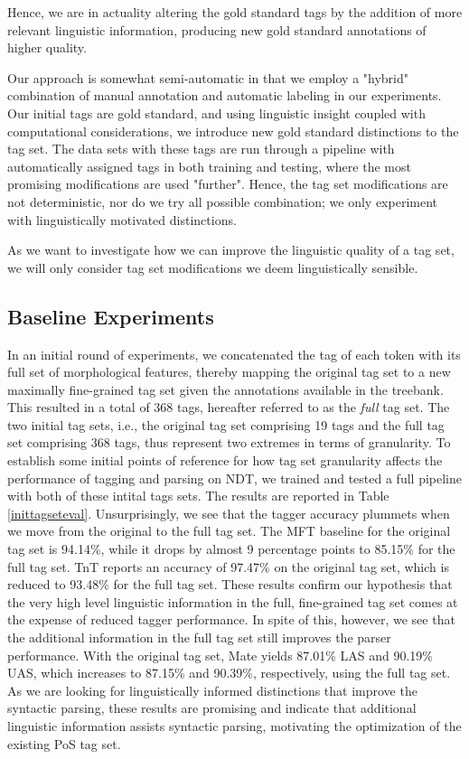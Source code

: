 \documentclass[11pt,a4paper]{article}
\begin{document}
Hence, we are in actuality altering the gold
standard tags by the addition of more relevant linguistic information,
producing new gold standard annotations of higher quality.

Our approach is somewhat semi-automatic in that we employ a "hybrid"
combination of manual annotation and automatic labeling in our experiments. Our
initial tags are gold standard, and using linguistic insight coupled with
computational considerations, we introduce new gold standard distinctions to
the tag set. The data sets with these tags are run through a pipeline with
automatically assigned tags in both training and testing, where the most
promising modifications are used "further". Hence, the tag set modifications
are not deterministic, nor do we try all possible combination; we only
experiment with linguistically motivated distinctions.

As we want to investigate how we can improve the linguistic quality of a tag
set, we will only consider tag set modifications we deem linguistically
sensible.

\subsection{Baseline Experiments}
In an initial round of experiments, we concatenated the tag of each token with
its full set of morphological features, thereby mapping the original tag set to a
new maximally fine-grained tag set given the annotations available in the
treebank. This resulted in a total of 368 tags,
hereafter referred to as the \emph{full} tag set.
The two initial tag sets, i.e., the original tag set comprising 19 tags and the
full tag set comprising 368 tags, thus represent two extremes in terms of
granularity.
To establish some initial points of reference for how tag set granularity affects the
performance of tagging and parsing on NDT, we trained and tested a full pipeline with both of
these intital tags sets. The results are reported in Table \ref{inittagseteval}.
Unsurprisingly, we see that the tagger accuracy
plummets when we move from the original to the full tag set. The MFT
baseline for the original tag set is 94.14\%, while it drops by almost 9
percentage points to 85.15\% for the full tag set. TnT reports an accuracy of
97.47\% on the original tag set, which is reduced to 93.48\% for the full tag
set. These results confirm our hypothesis that the very high level linguistic
information
in the full, fine-grained tag set comes at the expense of reduced tagger
performance.  In spite of this, however, we see that the additional information
in the full tag set still improves the parser performance. With the original tag set, Mate
yields 87.01\% LAS and 90.19\% UAS, which increases to 87.15\% and
90.39\%, respectively, using the full tag set. As we are looking for
linguistically informed distinctions that improve the syntactic parsing, these
results are promising and indicate that additional linguistic
information assists syntactic parsing, motivating the optimization of the
existing PoS tag set.
\end{document}
